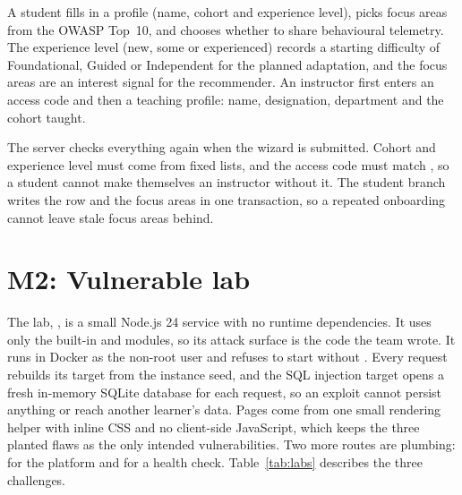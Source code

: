 A student fills in a profile (name, cohort and experience level), picks focus areas from the OWASP Top~10, and chooses whether to share behavioural telemetry. The experience level (new, some or experienced) records a starting difficulty of Foundational, Guided or Independent for the planned adaptation, and the focus areas are an interest signal for the recommender. An instructor first enters an access code and then a teaching profile: name, designation, department and the cohort taught.

The server checks everything again when the wizard is submitted. Cohort and experience level must come from fixed lists, and the access code must match , so a student cannot make themselves an instructor without it. The student branch writes the  row and the focus areas in one transaction, so a repeated onboarding cannot leave stale focus areas behind.


\section{M2: Vulnerable lab}
\label{sec:m2}

The lab, , is a small Node.js 24 service with no runtime dependencies. It uses only the built-in  and  modules, so its attack surface is the code the team wrote. It runs in Docker as the non-root  user and refuses to start without . Every request rebuilds its target from the instance seed, and the SQL injection target opens a fresh in-memory SQLite database for each request, so an exploit cannot persist anything or reach another learner's data. Pages come from one small rendering helper with inline CSS and no client-side JavaScript, which keeps the three planted flaws as the only intended vulnerabilities. Two more routes are plumbing:  for the platform and  for a health check. Table~\ref{tab:labs} describes the three challenges.

